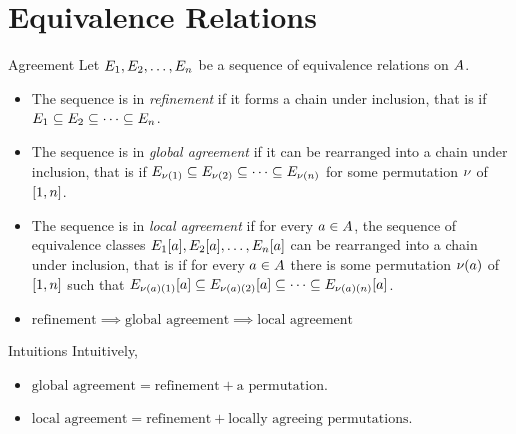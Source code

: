 \documentclass{beamer}
\begin{document}
\section{Equivalence Relations}
\begin{frame}{Agreement}
Let $E_{1},E_{2},\dots,E_{n}$ be a sequence of equivalence relations on
$A$.
\begin{itemize}
  \item The sequence is in \emph{refinement} if it forms a chain under
  inclusion,
  that is if $E_{1}\subseteq E_{2}\subseteq\dots\subseteq E_{n}$.
  \pause
  \item The sequence is in \emph{global agreement} if it can be rearranged into
  a chain under inclusion,
  that is if $E_{\nu(1)}\subseteq E_{\nu(2)}\subseteq\dots
  \subseteq E_{\nu(n)}$ for some permutation $\nu$ of $[1,n]$.
  \pause
  \item The sequence is in \emph{local agreement} if for every $a\in A$,
  the sequence of equivalence classes
  $E_{1}[a],E_{2}[a],\dots,E_{n}[a]$ can be rearranged into a
  chain under inclusion, that is if for every $a\in A$ there
  is some permutation $\nu(a)$ of $[1,n]$ such that
  $E_{\nu(a)(1)}[a]\subseteq E_{\nu(a)(2)}[a]\subseteq
  \dots\subseteq E_{\nu(a)(n)}[a]$.
  \pause
  \item $\text{refinement} \implies \text{global agreement} \implies
  \text{local agreement}$
\end{itemize}
\end{frame}

\begin{frame}{Intuitions}
Intuitively,
\begin{itemize}
  \item 
  $\text{global agreement} = \text{refinement} + \text{a permutation}$.
  \pause
  \item
  $\text{local agreement} = \text{refinement} + \text{locally agreeing
  permutations}$.
\end{itemize}
\end{frame}
\end{document}
